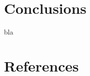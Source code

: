 \documentclass[review]{elsarticle}
\begin{document}
\section{Conclusions}
\label{sec:ccl}
bla 

\section*{References}



\end{document}
